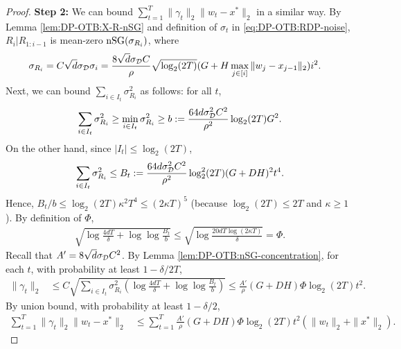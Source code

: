 \begin{proof}
\textbf{Step 2:} We can bound $\sum_{t=1}^T\|\gamma_t\|_2\|w_t-x^*\|_2$ in a similar way. By Lemma \ref{lem:DP-OTB:X-R-nSG} and definition of $\sigma_t$ in \eqref{eq:DP-OTB:RDP-noise}, $R_i|R_{1:i-1}$ is mean-zero $\mathrm{nSG}(\sigma_{R_i})$, where
\begin{align*}
    \sigma_{R_i} 
    &= C\sqrt{d}\sigma_{\cal D} \sigma_i
    = \frac{8\sqrt{d}\sigma_{\cal D} C}{\rho}   \sqrt{\log_2(2T)}(G+H\max_{j\in[i]}\|w_j-x_{j-1}\|_2)i^2.
\end{align*}
Next, we can bound $\sum_{i\in I_t}\sigma_{R_i}^2$ as follows: for all $t$,
\begin{align*}
    \sum_{i\in I_t} \sigma_{R_i}^2 \geq \min_{i\in I_t}\sigma_{R_i}^2 \geq b:= \frac{64d\sigma_{\cal D}^2C^2}{\rho^2}\log_2(2T)G^2.
\end{align*}
On the other hand, since $|I_t|\leq \log_2(2T)$,
\begin{align}
    \sum_{i\in I_t} \sigma_{R_i}^2 \leq B_t:= \frac{64d\sigma_{\cal D}^2C^2}{\rho^2} \log_2^2(2T) (G+DH)^2 t^4.
    \notag
\end{align}
Hence, $B_t/b \leq \log_2(2T)\kappa^2T^4 \leq (2\kappa T)^5$ (because $\log_2(2T)\leq 2T$ and $\kappa\geq 1$). By definition of $\Phi$,
\begin{align*}
    \sqrt{\log\frac{4dT}{\delta}+\log\log\frac{B_t}{b}}
    \leq \sqrt{\log\frac{20dT\log(2\kappa T)}{\delta}} = \Phi.
\end{align*}
Recall that $A'=8\sqrt{d}\sigma_{\cal D} C^2$. By Lemma \ref{lem:DP-OTB:nSG-concentration}, for each $t$, with probability at least $1-\delta/2T$,
\begin{align}
    \|\gamma_t\|_2 
    &\leq C\sqrt{\sum_{i\in I_t}\sigma_{R_i}^2\left(\log\frac{4dT}{\delta}+\log\log\frac{B_t}{b}\right)}
    \leq \frac{A'}{\rho}(G+DH)\Phi \log_2(2T)t^2.
    \label{eq:DP-OTB:privacy-concentration}
\end{align}
By union bound, with probability at least $1-\delta/2$,
\begin{align*}
    \sum_{t=1}^T\|\gamma_t\|_2\|w_t-x^*\|_2 
    &\leq \sum_{t=1}^T \frac{A'}{\rho}(G+DH)\Phi \log_2(2T)t^2(\|w_t\|_2+\|x^*\|_2).
\end{align*}


\end{proof}
